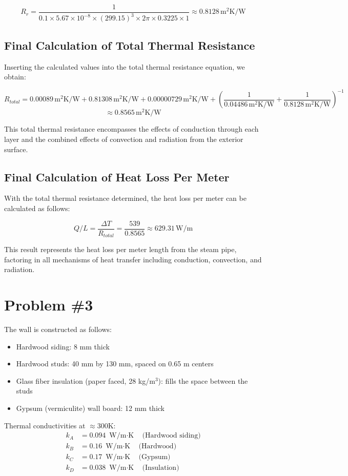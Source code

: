 \documentclass{article}
\begin{document}
\[
R_r = \frac{1}{0.1 \times 5.67 \times 10^{-8} \times (299.15)^3 \times 2 \pi \times 0.3225 \times 1} \approx 0.8128 \, \text{m}^2\text{K/W}
\]
\subsection*{Final Calculation of Total Thermal Resistance}
Inserting the calculated values into the total thermal resistance equation, we obtain:

\[
R_{total} = 0.00089 \, \text{m}^2\text{K/W} + 0.81308 \, \text{m}^2\text{K/W} + 0.00000729 \, \text{m}^2\text{K/W} + \left(\frac{1}{0.04486 \, \text{m}^2\text{K/W}} + \frac{1}{0.8128 \, \text{m}^2\text{K/W}}\right)^{-1} 
\]
\[
\approx 0.8565 \, \text{m}^2\text{K/W}
\]

This total thermal resistance encompasses the effects of conduction through each layer and the combined effects of convection and radiation from the exterior surface.

\subsection*{Final Calculation of Heat Loss Per Meter}
With the total thermal resistance determined, the heat loss per meter can be calculated as follows:

\[
Q/L = \frac{\Delta T}{R_{total}} = \frac{539}{0.8565} \approx 629.31 \, \text{W/m}
\]

This result represents the heat loss per meter length from the steam pipe, factoring in all mechanisms of heat transfer including conduction, convection, and radiation.

\newpage
\section*{Problem \#3}
The wall is constructed as follows:
\begin{itemize}
    \item Hardwood siding: 8 mm thick
    \item Hardwood studs: 40 mm by 130 mm, spaced on 0.65 m centers
    \item Glass fiber insulation (paper faced, 28 kg/m$^3$): fills the space between the studs
    \item Gypsum (vermiculite) wall board: 12 mm thick
\end{itemize}
Thermal conductivities at $\approx$300K:
\begin{align*}
    k_A &= 0.094 \text{ W/m$\cdot$K} \quad \text{(Hardwood siding)} \\
    k_B &= 0.16 \text{ W/m$\cdot$K} \quad \text{(Hardwood)} \\
    k_C &= 0.17 \text{ W/m$\cdot$K} \quad \text{(Gypsum)} \\
    k_D &= 0.038 \text{ W/m$\cdot$K} \quad \text{(Insulation)}
\end{align*}
\end{document}

